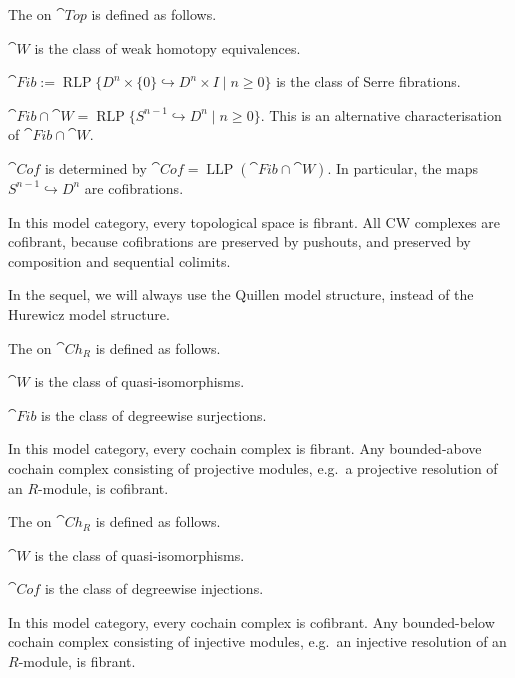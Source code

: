 \begin{example}
    The  on $\cat{Top}$ is defined as follows.
    \begin{itms}
        \item $\cat{W}$ is the class of weak homotopy equivalences.
        \item $\cat{Fib}:=\operatorname{RLP}\{D^n\times\{0\}\hookrightarrow D^n\times I\mid n\geq0\}$
        is the class of Serre fibrations.
        \item $\cat{Fib}\cap\cat W=\operatorname{RLP}\{S^{n-1}\hookrightarrow D^n\mid n\geq0\}$.
        This is an alternative characterisation of $\cat{Fib}\cap\cat W$.
        \item $\cat{Cof}$ is determined by $\cat{Cof}=\operatorname{LLP}(\cat{Fib}\cap\cat W)$.
        In particular, the maps $S^{n-1}\hookrightarrow D^n$ are cofibrations.
    \end{itms}
    In this model category, every topological space is fibrant.
    All CW complexes are cofibrant,
    because cofibrations are preserved by pushouts,
    and preserved by composition and sequential colimits.
\end{example}

In the sequel, we will always use the Quillen model structure,
instead of the Hurewicz model structure.

\begin{example}
    The  on $\cat{Ch}_R$ is defined as follows.
    \begin{itms}
        \item $\cat{W}$ is the class of quasi-isomorphisms.
        \item $\cat{Fib}$ is the class of degreewise surjections.
    \end{itms}
    In this model category, every cochain complex is fibrant.
    Any bounded-above cochain complex consisting of projective modules,
    e.g.\ a projective resolution of an $R$-module,
    is cofibrant. \varqed
\end{example}

\begin{example}
    The  on $\cat{Ch}_R$ is defined as follows.
    \begin{itms}
        \item $\cat{W}$ is the class of quasi-isomorphisms.
        \item $\cat{Cof}$ is the class of degreewise injections.
    \end{itms}
    In this model category, every cochain complex is cofibrant.
    Any bounded-below cochain complex consisting of injective modules,
    e.g.\ an injective resolution of an $R$-module,
    is fibrant. \varqed
\end{example}

